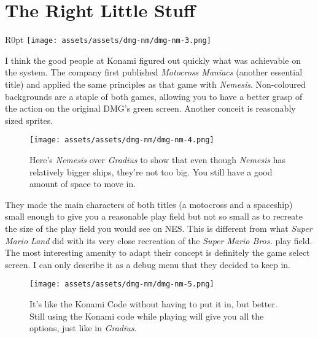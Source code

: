 \documentclass{book}
\begin{document}
\FloatBarrier\needspace{5pt}\section*{The Right Little Stuff}\nopagebreak[4]

\begin{wrapfigure}{R}{0pt} \texttt{[image: assets/assets/dmg-nm/dmg-nm-3.png]}\end{wrapfigure}
I think the good people at Konami figured out quickly what was achievable on the system. The company first published \emph{Motocross Maniacs} (another essential title) and applied the same principles as that game with \emph{Nemesis}. Non-coloured backgrounds are a staple of both games, allowing you to have a better grasp of the action on the original DMG’s green screen. Another conceit is reasonably sized sprites.

\begin{figure}[hbt]
\vskip 10pt
\centering \texttt{[image: assets/assets/dmg-nm/dmg-nm-4.png]}\par\pagetwodescription Here’s \emph{Nemesis} over \emph{Gradius} to show that even though \emph{Nemesis} has relatively bigger ships, they’re not too big. You still have a good amount of space to move in.
\vskip 6pt
\end{figure}

They made the main characters of both titles (a motocross and a spaceship) small enough to give you a reasonable play field but not so small as to recreate the size of the play field you would see on NES. This is different from what \emph{Super Mario Land} did with its very close recreation of the \emph{Super Mario Bros.} play field. The most interesting amenity to adapt their concept is definitely the game select screen. I can only describe it as a debug menu that they decided to keep in.

\begin{figure}[hbt]
\vskip 10pt
\centering \texttt{[image: assets/assets/dmg-nm/dmg-nm-5.png]}\par\pagetwodescription It’s like the Konami Code without having to put it in, but better. Still using the Konami code while playing will give you all the options, just like in \emph{Gradius}.
\vskip 6pt
\end{figure}
\end{document}
